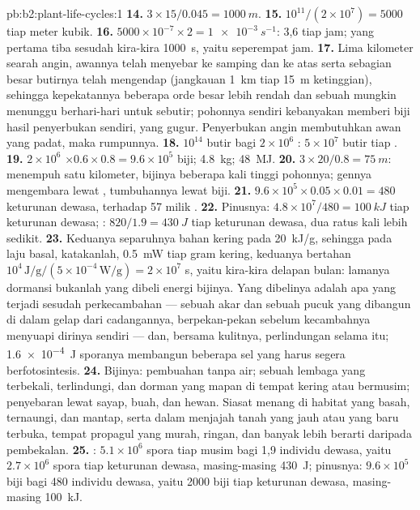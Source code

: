 \begin{solution}{pb:b2:plant-life-cycles:1}
\textbf{14.} $3\times 15/0.045 = \qty{1000}{m}$.
\textbf{15.} $10^{11}/(2\times 10^{7}) = \num{5000}$ tiap meter kubik.
\textbf{16.} $5000\times 10^{-7}\times 2 = \qty{1e-3}{s^{-1}}$: 3,6 tiap
jam; yang pertama tiba sesudah kira-kira \qty{1000}{s}, yaitu
seperempat jam.
\textbf{17.} Lima kilometer searah angin, awannya telah menyebar ke
samping dan ke atas serta sebagian besar butirnya telah mengendap
(jangkauan \qty{1}{km} tiap \qty{15}{m} ketinggian), sehingga
kepekatannya beberapa orde besar lebih rendah dan sebuah 
mungkin menunggu berhari-hari untuk sebutir;  pohonnya
sendiri kebanyakan memberi biji hasil penyerbukan sendiri, yang gugur.
Penyerbukan angin membutuhkan awan yang padat, maka rumpunnya.
\textbf{18.} $10^{14}$ butir bagi $2\times 10^{6}$ : $5\times
10^{7}$ butir tiap .
\textbf{19.} $2\times 10^{6}$  $\times 0.6\times 0.8 = 9.6\times
10^{5}$ biji; \qty{4.8}{kg}; \qty{48}{MJ}.
\textbf{20.} $3\times 20/0.8 = \qty{75}{m}$:  menempuh
satu kilometer, bijinya beberapa kali tinggi pohonnya; gennya
mengembara lewat , tumbuhannya lewat biji.
\textbf{21.} $9.6\times 10^{5}\times 0.05\times 0.01 = 480$ keturunan
dewasa, terhadap 57 milik .
\textbf{22.} Pinusnya: $4.8\times 10^{7}/480 = \qty{100}{kJ}$ tiap
keturunan dewasa; : $820/1.9 = \qty{430}{J}$ tiap
keturunan dewasa, dua ratus kali lebih sedikit.
\textbf{23.} Keduanya separuhnya bahan kering pada \qty{20}{kJ/g},
sehingga pada laju basal, katakanlah, \qty{0.5}{mW} tiap gram kering,
keduanya bertahan $10^{4}\,
\text{J/g}/(5\times 10^{-4}\,\text{W/g}) = 2\times 10^{7}$ s, yaitu
kira-kira delapan bulan: lamanya dormansi bukanlah yang dibeli energi
bijinya. Yang dibelinya adalah apa yang terjadi sesudah perkecambahan
--- sebuah akar dan sebuah pucuk yang dibangun di dalam gelap dari
cadangannya, berpekan-pekan sebelum kecambahnya menyuapi dirinya
sendiri --- dan, bersama kulitnya, perlindungan selama itu;
\qty{1.6e-4}{J} sporanya membangun beberapa sel yang harus segera
berfotosintesis.
\textbf{24.} Bijinya: pembuahan tanpa air; sebuah lembaga yang
terbekali, terlindungi, dan dorman yang mapan di tempat kering atau
bermusim; penyebaran lewat sayap, buah, dan hewan. Siasat  menang di habitat yang basah, ternaungi, dan mantap, serta
dalam menjajah tanah yang jauh atau yang baru terbuka, tempat propagul
yang murah, ringan, dan banyak lebih berarti daripada pembekalan.
\textbf{25.} : $5.1\times 10^{6}$ spora tiap musim bagi
1,9 individu dewasa, yaitu $2.7\times 10^{6}$ spora tiap keturunan
dewasa, masing-masing \qty{430}{J}; pinusnya: $9.6\times 10^{5}$ biji
bagi 480 individu dewasa, yaitu \num{2000} biji tiap keturunan dewasa,
masing-masing \qty{100}{kJ}.
\end{solution}
